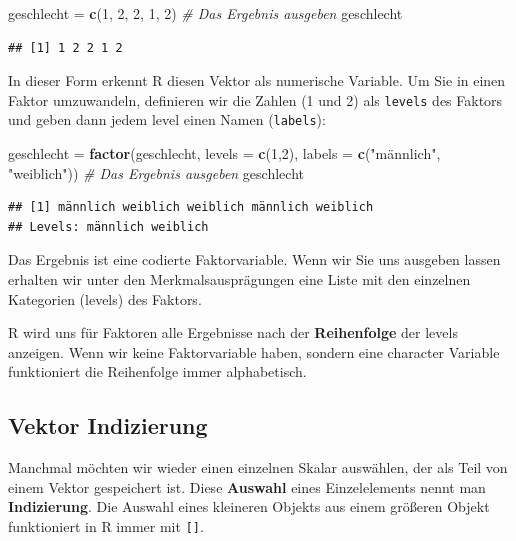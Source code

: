 \documentclass[
]{book}
\newenvironment{Shaded}{\begin{snugshade}}{\end{snugshade}}
\newcommand{\AttributeTok}[1]{\textcolor[rgb]{0.13,0.29,0.53}{#1}}
\newcommand{\CommentTok}[1]{\textcolor[rgb]{0.56,0.35,0.01}{\textit{#1}}}
\newcommand{\DecValTok}[1]{\textcolor[rgb]{0.00,0.00,0.81}{#1}}
\newcommand{\FunctionTok}[1]{\textcolor[rgb]{0.13,0.29,0.53}{\textbf{#1}}}
\newcommand{\NormalTok}[1]{#1}
\newcommand{\OtherTok}[1]{\textcolor[rgb]{0.56,0.35,0.01}{#1}}
\newcommand{\StringTok}[1]{\textcolor[rgb]{0.31,0.60,0.02}{#1}}
\begin{document}
\begin{Shaded}
\begin{Highlighting}[]
\NormalTok{geschlecht }\OtherTok{=} \FunctionTok{c}\NormalTok{(}\DecValTok{1}\NormalTok{, }\DecValTok{2}\NormalTok{, }\DecValTok{2}\NormalTok{, }\DecValTok{1}\NormalTok{, }\DecValTok{2}\NormalTok{)}
\CommentTok{\# Das Ergebnis ausgeben}
\NormalTok{geschlecht}
\end{Highlighting}
\end{Shaded}

\begin{verbatim}
## [1] 1 2 2 1 2
\end{verbatim}

In dieser Form erkennt R diesen Vektor als numerische Variable. Um Sie in einen Faktor umzuwandeln, definieren wir die Zahlen (1 und 2) als \texttt{levels} des Faktors und geben dann jedem level einen Namen (\texttt{labels}):

\begin{Shaded}
\begin{Highlighting}[]
\NormalTok{geschlecht }\OtherTok{=} \FunctionTok{factor}\NormalTok{(geschlecht, }\AttributeTok{levels =} \FunctionTok{c}\NormalTok{(}\DecValTok{1}\NormalTok{,}\DecValTok{2}\NormalTok{), }\AttributeTok{labels =} \FunctionTok{c}\NormalTok{(}\StringTok{"männlich"}\NormalTok{, }\StringTok{"weiblich"}\NormalTok{))}
\CommentTok{\# Das Ergebnis ausgeben}
\NormalTok{geschlecht}
\end{Highlighting}
\end{Shaded}

\begin{verbatim}
## [1] männlich weiblich weiblich männlich weiblich
## Levels: männlich weiblich
\end{verbatim}

Das Ergebnis ist eine codierte Faktorvariable. Wenn wir Sie uns ausgeben lassen erhalten wir unter den Merkmalsausprägungen eine Liste mit den einzelnen Kategorien (levels) des Faktors.

R wird uns für Faktoren alle Ergebnisse nach der \textbf{Reihenfolge} der levels anzeigen. Wenn wir keine Faktorvariable haben, sondern eine character Variable funktioniert die Reihenfolge immer alphabetisch.

\subsection{Vektor Indizierung}\label{vektor-indizierung}

Manchmal möchten wir wieder einen einzelnen Skalar auswählen, der als Teil von einem Vektor gespeichert ist. Diese \textbf{Auswahl} eines Einzelelements nennt man \textbf{Indizierung}. Die Auswahl eines kleineren Objekts aus einem größeren Objekt funktioniert in R immer mit \texttt{{[}{]}}.
\end{document}
